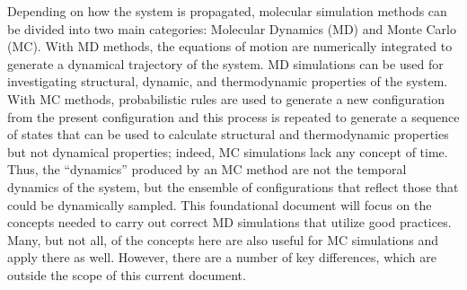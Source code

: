 \documentclass[9pt,bestpractices]{livecoms}
\begin{document}
Depending on how the system is propagated, molecular simulation methods can be divided into two main categories: Molecular Dynamics (MD) and Monte Carlo (MC).
With MD methods, the equations of motion are numerically integrated to generate a dynamical trajectory of the system.
MD simulations can be used for investigating structural, dynamic, and thermodynamic properties of the system.
With MC methods, probabilistic rules are used to generate a new configuration from the present configuration and this process is repeated to generate a sequence of states that can be used to calculate structural and thermodynamic properties but not dynamical properties; indeed, MC simulations lack any concept of time.
Thus, the ``dynamics'' produced by an MC method are not the temporal dynamics of the system, but the ensemble of configurations that reflect those that could be dynamically sampled.
This foundational document will focus on the concepts needed to carry out correct MD simulations that utilize good practices.
Many, but not all, of the concepts here are also useful for MC simulations and apply there as well. However, there are a number of key differences, which are outside the scope of this current document.
\end{document}
